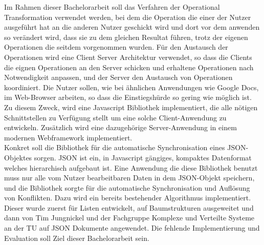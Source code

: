 \documentclass[pdftex,12pt,a4paper]{article}
\begin{document}
Im Rahmen dieser Bachelorarbeit soll das Verfahren der Operational Transformation verwendet werden, bei dem die Operation die einer der Nutzer ausgeführt hat an die anderen Nutzer geschickt wird und dort vor dem anwenden so verändert wird, dass sie zu dem gleichen Resultat führen, trotz der eigenen Operationen die seitdem vorgenommen wurden. Für den Austausch der Operationen wird eine Client Server Architektur verwendet, so dass die Clients die eignen Operationen an den Server schicken und erhaltene Operationen nach Notwendigkeit anpassen, und der Server den Austausch von Operationen koordiniert. Die Nutzer sollen, wie bei ähnlichen Anwendungen wie Google Docs, im Web-Browser arbeiten, so dass die Einstiegshürde so gering wie möglich ist. Zu diesem Zweck, wird eine Javascript Bibliothek implementiert, die alle nötigen Schnittstellen zu Verfügung stellt um eine solche Client-Anwendung zu entwickeln. Zusätzlich wird eine dazugehörige Server-Anwendung in einem modernen Webframework implementiert.\\

Konkret soll die Bibliothek für die automatische Synchronisation eines JSON-Objektes sorgen. JSON ist ein, in Javascript gängiges, kompaktes Datenformat welches hierarchisch aufgebaut ist. Eine Anwendung die diese Bibliothek benutzt muss nur alle vom Nutzer bearbeitbaren Daten in dem JSON-Objekt speichern, und die Bibliothek sorgte für die automatische Synchronisation und Auflösung von Konflikten. Dazu wird ein bereits bestehender Algorithmus implementiert. Dieser wurde zuerst für Listen entwickelt, auf Baumstrukturen ausgeweitet und dann von Tim Jungnickel und der Fachgruppe Komplexe und Verteilte Systeme an der TU auf JSON Dokumente angewendet. Die fehlende Implementierung und Evaluation soll Ziel dieser Bachelorarbeit sein.\\


\end{document}

